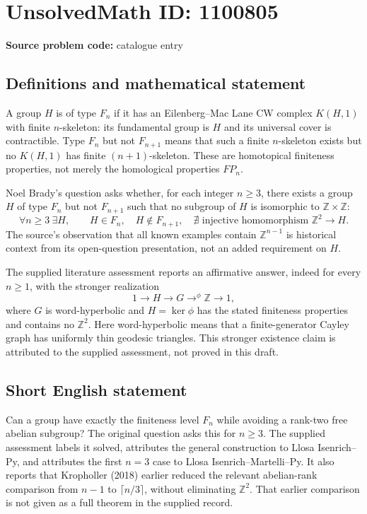 \documentclass[11pt]{article}
\newcommand{\Z}{\mathbb{Z}}
\begin{document}
\section*{UnsolvedMath ID: 1100805}
\textbf{Source problem code:} catalogue entry
\subsection{Definitions and mathematical statement}
A group $H$ is of type $F_n$ if it has an Eilenberg--Mac Lane CW complex $K(H,1)$ with finite $n$-skeleton: its fundamental group is $H$ and its universal cover is contractible. Type $F_n$ but not $F_{n+1}$ means that such a finite $n$-skeleton exists but no $K(H,1)$ has finite $(n+1)$-skeleton. These are homotopical finiteness properties, not merely the homological properties $FP_n$.

Noel Brady's question asks whether, for each integer $n\geq3$, there exists a group $H$ of type $F_n$ but not $F_{n+1}$ such that no subgroup of $H$ is isomorphic to $\Z\times\Z$:
\[
 \forall n\geq3\ \exists H,\qquad
 H\in F_n,\quad H\notin F_{n+1},\quad
 \nexists\text{ injective homomorphism }\Z^2\longrightarrow H.
\]
The source's observation that all known examples contain $\Z^{n-1}$ is historical context from its open-question presentation, not an added requirement on $H$.

The supplied literature assessment reports an affirmative answer, indeed for every $n\geq1$, with the stronger realization
\[
 1\longrightarrow H\longrightarrow G
 \mathrel{\mathop{\longrightarrow}^{\phi}}\Z\longrightarrow1,
\]
where $G$ is word-hyperbolic and $H=\ker\phi$ has the stated finiteness properties and contains no $\Z^2$. Here word-hyperbolic means that a finite-generator Cayley graph has uniformly thin geodesic triangles. This stronger existence claim is attributed to the supplied assessment, not proved in this draft.
\subsection{Short English statement}
Can a group have exactly the finiteness level $F_n$ while avoiding a rank-two free abelian subgroup? The original question asks this for $n\geq3$. The supplied assessment labels it solved, attributes the general construction to Llosa Isenrich--Py, and attributes the first $n=3$ case to Llosa Isenrich--Martelli--Py. It also reports that Kropholler (2018) earlier reduced the relevant abelian-rank comparison from $n-1$ to $\lceil n/3\rceil$, without eliminating $\Z^2$. That earlier comparison is not given as a full theorem in the supplied record.
\end{document}
